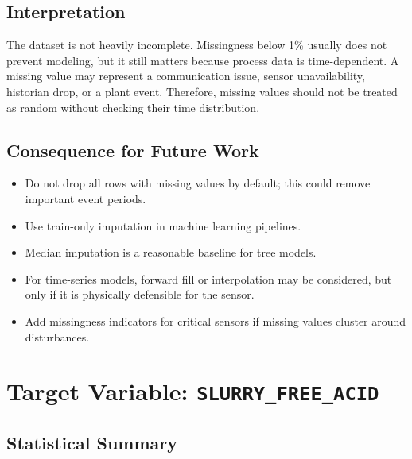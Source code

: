 \documentclass[11pt,a4paper]{article}
\begin{document}
\subsection{Interpretation}

The dataset is not heavily incomplete. Missingness below 1\% usually does not prevent modeling, but it still matters because process data is time-dependent. A missing value may represent a communication issue, sensor unavailability, historian drop, or a plant event. Therefore, missing values should not be treated as random without checking their time distribution.

\subsection{Consequence for Future Work}

\begin{itemize}
    \item Do not drop all rows with missing values by default; this could remove important event periods.
    \item Use train-only imputation in machine learning pipelines.
    \item Median imputation is a reasonable baseline for tree models.
    \item For time-series models, forward fill or interpolation may be considered, but only if it is physically defensible for the sensor.
    \item Add missingness indicators for critical sensors if missing values cluster around disturbances.
\end{itemize}

\section{Target Variable: \texttt{SLURRY\_FREE\_ACID}}

\subsection{Statistical Summary}
\end{document}
